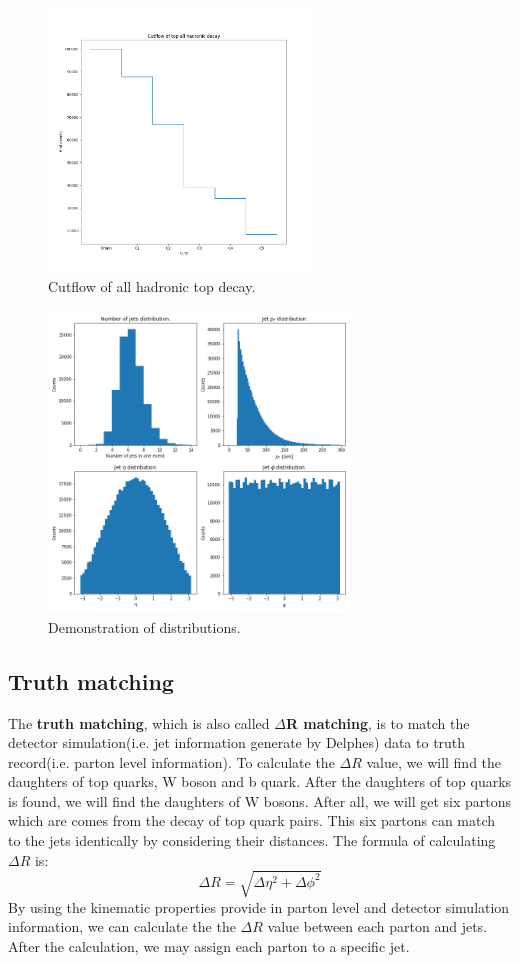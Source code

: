 \begin{figure}[!h]
	\includegraphics[width=0.8\linewidth, height=7cm,keepaspectratio=true]{Figures/ttbar_cutflow.png}
	\caption{Cutflow of all hadronic top decay.}
	\label{fig:cutflow}
\end{figure}
\begin{figure}[H]
	\includegraphics[width=0.8\linewidth, height=8cm,keepaspectratio=true]{Figures/ttbar_kinematic_dist.png}
	\caption{Demonstration of distributions.}
	\label{fig:kinematic dist}
\end{figure}
\newpage

\subsection{Truth matching}\label{subsec:Truth matching}
The \textbf{truth matching}, which is also called \textbf{$\Delta$R matching},  is to match the detector simulation(i.e. jet information generate by Delphes) data to truth record(i.e. parton level information).  To calculate the $\Delta R$ value, we will find the daughters of top quarks, W boson and b quark. After the daughters of top quarks is found, we will find the daughters of W bosons. After all, we will get six partons which are comes from the decay of top quark pairs. This six partons can match to the jets identically by considering their distances. The formula of calculating $\Delta R$ is:
\begin{equation}
	\Delta R = \sqrt{\Delta\eta^{2} + \Delta\phi^{2}}
\end{equation}
By using the kinematic properties provide in parton level and detector simulation information, we can calculate the the $\Delta R$ value between each parton and jets. After the calculation, we may assign each parton to a specific jet. 

